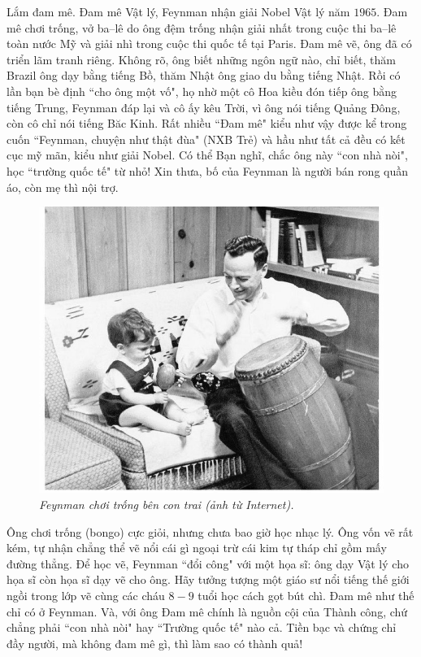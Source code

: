 \begin{multicols}{2}
	Lắm đam mê. Đam mê Vật lý, Feynman nhận giải Nobel Vật lý năm $1965$. Đam mê chơi trống, vở ba--lê do ông đệm trống nhận giải nhất trong cuộc thi ba--lê toàn nước Mỹ và giải nhì trong cuộc thi quốc tế tại Paris. Đam mê vẽ, ông đã có triển lãm tranh riêng. Không rõ, ông biết những ngôn ngữ nào, chỉ biết, thăm Brazil ông dạy bằng tiếng Bồ, thăm Nhật ông giao du bằng tiếng Nhật. Rồi có lần bạn bè định ``cho ông một vố", họ nhờ một cô Hoa kiều đón tiếp ông bằng tiếng Trung, Feynman đáp lại và cô ấy kêu Trời, vì ông nói tiếng Quảng Đông, còn cô chỉ nói tiếng Băc Kinh. Rất nhiều ``Đam mê" kiểu như vậy được kể trong cuốn ``Feynman, chuyện như thật đùa" (NXB Trẻ) và hầu như tất cả đều có kết cục mỹ mãn, kiểu như giải Nobel. Có thể Bạn nghĩ, chắc ông này ``con nhà nòi", học ``trường quốc tế" từ nhỏ! Xin thưa, bố của Feynman là người bán rong quần áo, còn mẹ thì nội trợ. 
	\begin{figure}[H]
		\vspace*{-5pt}
		\centering
		\captionsetup{labelformat= empty, justification=centering}
		\includegraphics[width= 1\linewidth]{2a}
		\caption{\small\textit{\color{quantoan}Feynman chơi trống bên con trai (ảnh từ Internet).}}
		\vspace*{-10pt}
	\end{figure}
	Ông chơi trống (bongo) cực giỏi, nhưng chưa bao giờ học nhạc lý. Ông vốn vẽ rất kém, tự nhận chẳng thể vẽ nổi cái gì ngoại trừ cái kim tự tháp chỉ gồm mấy đường thẳng. Để học vẽ, Feynman ``đổi công" với một họa sĩ: ông dạy Vật lý cho họa sĩ còn họa sĩ dạy vẽ cho ông. Hãy tưởng tượng một giáo sư nổi tiếng thế giới ngồi trong lớp vẽ cùng các cháu $8-9$ tuổi học cách gọt bút chì. Đam mê như thế chỉ có ở Feynman. Và, với ông Đam mê chính là nguồn cội của Thành công, chứ chẳng phải ``con nhà nòi" hay ``Trường quốc tế" nào cả. Tiền bạc và chứng chỉ đầy người, mà không đam mê gì, thì làm sao có thành quả! 

\end{multicols}
